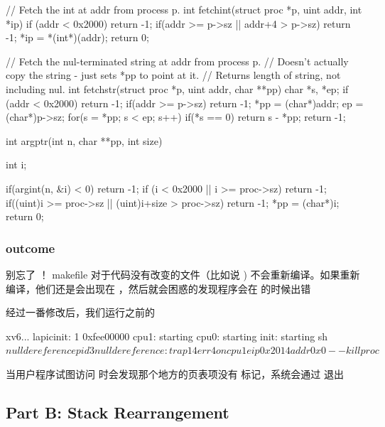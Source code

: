 \begin{ccode}
    // Fetch the int at addr from process p.
    int
    fetchint(struct proc *p, uint addr, int *ip)
    {
        if (addr < 0x2000) return -1;
        if(addr >= p->sz || addr+4 > p->sz)
            return -1;
        *ip = *(int*)(addr);
        return 0;
    }

    // Fetch the nul-terminated string at addr from process p.
    // Doesn't actually copy the string - just sets *pp to point at it.
    // Returns length of string, not including nul.
    int
    fetchstr(struct proc *p, uint addr, char **pp)
    {
        char *s, *ep;
        if (addr < 0x2000) return -1;
        if(addr >= p->sz)
            return -1;
        *pp = (char*)addr;
        ep = (char*)p->sz;
        for(s = *pp; s < ep; s++)
            if(*s == 0)
            return s - *pp;
        return -1;
    }

    int
    argptr(int n, char **pp, int size)
    {
        int i;
        
        if(argint(n, &i) < 0)
            return -1;
        if (i < 0x2000 || i >= proc->sz) return -1;
        if((uint)i >= proc->sz || (uint)i+size > proc->sz)
            return -1;
        *pp = (char*)i;
        return 0;
    }
\end{ccode}

\subsubsection{outcome}

别忘了  ！ makefile 对于代码没有改变的文件（比如说 ) 不会重新编译。如果重新编译，他们还是会出现在 ，然后就会困惑的发现程序会在  的时候出错 

经过一番修改后，我们运行之前的 

\begin{textcode}
    xv6...
    lapicinit: 1 0xfee00000
    cpu1: starting
    cpu0: starting
    init: starting sh
    $ nulldereference
    pid 3 nulldereference: trap 14 err 4 on cpu 1 eip 0x2014 addr 0x0--kill proc
    $ 
\end{textcode}

当用户程序试图访问  时会发现那个地方的页表项没有  标记，系统会通过  退出

\subsection{Part B: Stack Rearrangement}

